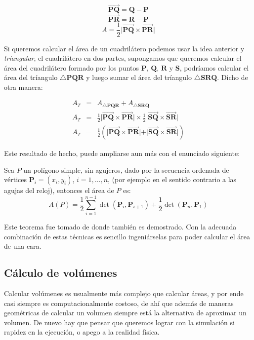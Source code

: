 $$\overrightarrow{\textbf{PQ}} = \textbf{Q} - \textbf{P}$$
$$\overrightarrow{\textbf{PR}} = \textbf{R} - \textbf{P}$$
$$ A = \frac{1}{2} \vert \overrightarrow{\textbf{PQ}} \times \overrightarrow{\textbf{PR}} \vert$$

Si queremos calcular el área de un cuadrilátero podemos usar la idea anterior y \emph{triangular}, el cuadrilátero en dos partes, supongamos que queremos calcular el área del cuadrilátero formado por los puntos $\textbf{P}$, $\textbf{Q}$, $\textbf{R}$ y $\textbf{S}$, podríamos calcular el área del tríangulo $\triangle \textbf{PQR}$ y luego sumar el área del tríangulo $\triangle \textbf{SRQ}$.
Dicho de otra manera:

\begin{eqnarray} 
A_{T} & = & A_{\triangle \textbf{PQR}} + A_{\triangle \textbf{SRQ}} \nonumber \\
A_{T} & = & \frac{1}{2} \vert \overrightarrow{\textbf{PQ}} \times \overrightarrow{\textbf{PR}} \vert \times \frac{1}{2} \vert \overrightarrow{\textbf{SQ}} \times \overrightarrow{\textbf{SR}} \vert \nonumber \\
\label{formulaArea}
A_{T} & = & \frac{1}{2} \left( \vert \overrightarrow{\textbf{PQ}} \times \overrightarrow{\textbf{PR}} \vert + \vert \overrightarrow{\textbf{SQ}} \times \overrightarrow{\textbf{SR}} \vert \right)
\end{eqnarray}

Este resultado de hecho, puede ampliarse aun más con el enunciado siguiente:

Sea $P$ un polígono simple, sin agujeros, dado por la secuencia ordenada de vértices $\textbf{P}_i = (x_i, y_i)$, $i = 1,\ldots,n$, (por ejemplo en el sentido contrario a las agujas del reloj), entonces el área de $P$ es:
$$A(P) = \frac{1}{2}\sum^{n-1}_{i = 1} \det (\textbf{P}_i, \textbf{P}_{i + 1}) + \frac{1}{2} \det (\textbf{P}_n, \textbf{P}_1)$$

Este teorema fue tomado de \cite{GeometriaParaCAD} donde también es demostrado. 
Con la adecuada combinación de estas técnicas es sencillo ingeniárselas para poder calcular el área de una cara.

\subsection{Cálculo de volúmenes}
Calcular volúmenes es usualmente más complejo que calcular áreas, y por ende casi siempre es computacionalmente costoso, de ahí que además de maneras geométricas de calcular un volumen siempre está la alternativa de aproximar un volumen.
De nuevo hay que pensar que queremos lograr con la simulación si rapidez en la ejecución, o apego a la realidad física.

